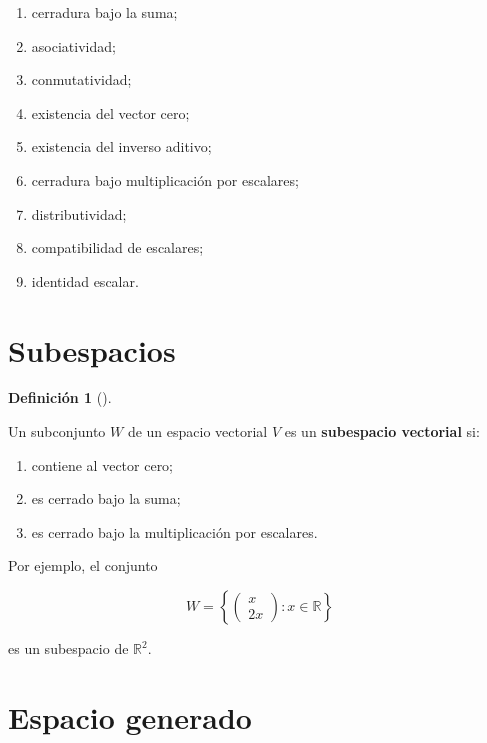 \documentclass[
  spanish,
  10.5pt,
  letterpaper,
  DIV=11,
  numbers=noendperiod,
  oneside,
  open=any]{scrreprt}
\providecommand{\tightlist}{%
  \setlength{\itemsep}{0pt}\setlength{\parskip}{0pt}}
\theoremstyle{definition}
\newtheorem{definition}{Definición}[chapter]
\theoremstyle{definition}
\theoremstyle{plain}
\theoremstyle{remark}
\begin{document}
\begin{enumerate}
\def\labelenumi{\arabic{enumi}.}
\tightlist
\item
  cerradura bajo la suma;
\item
  asociatividad;
\item
  conmutatividad;
\item
  existencia del vector cero;
\item
  existencia del inverso aditivo;
\item
  cerradura bajo multiplicación por escalares;
\item
  distributividad;
\item
  compatibilidad de escalares;
\item
  identidad escalar.
\end{enumerate}

\section*{Subespacios}\label{subespacios}


\begin{definition}[]\protect\hypertarget{def-subespacio}{}\label{def-subespacio}

Un subconjunto \(W\) de un espacio vectorial \(V\) es un
\textbf{subespacio vectorial} si:

\begin{enumerate}
\def\labelenumi{\arabic{enumi}.}
\tightlist
\item
  contiene al vector cero;
\item
  es cerrado bajo la suma;
\item
  es cerrado bajo la multiplicación por escalares.
\end{enumerate}

\end{definition}

Por ejemplo, el conjunto

\[
W
=
\left\{
\begin{pmatrix}
x\\
2x
\end{pmatrix}
:
x\in\mathbb{R}
\right\}
\]

es un subespacio de \(\mathbb{R}^{2}\).

\section*{Espacio generado}\label{espacio-generado}
\end{document}
